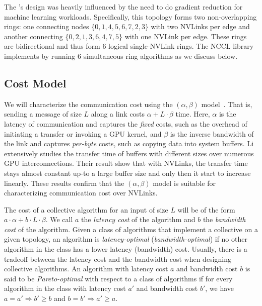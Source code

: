The \dgxone's design was heavily influenced by the need to do gradient reduction for machine learning workloads. Specifically, this topology forms two non-overlapping rings: one connecting nodes $\{0,1,4,5,6,7,2,3\}$ with two NVLinks per edge and another connecting $\{0,2,1,3,6,4,7,5\}$ with one NVLink per edge. These rings are bidirectional and thus form $6$ logical single-NVLink rings. The NCCL library implements \allgather by running $6$ simultaneous ring algorithms as we discuss below.


\subsection{Cost Model}

We will characterize the communication cost using the $(\alpha, \beta)$ model~\cite{hockney1994communication}. That is, sending a message of size $L$ along a link costs $\alpha + L\cdot\beta$ time.
Here, $\alpha$ is the latency of communication and captures the {\em fixed} costs, such as the overhead of initiating a transfer or invoking a GPU kernel,
and $\beta$ is the inverse bandwidth of the link and captures {\em per-byte} costs, such as copying data into system buffers. Li \etal{} extensively studies the transfer time of buffers with
different sizes over numerous GPU interconnections\cite{alphabeta}. Their result show that with NVLinks, the transfer time stays almost constant up-to a large buffer size and only then it start to increase linearly.
These results confirm that the $(\alpha,\beta)$ model is suitable for characterizing communication cost over NVLinks.

The cost of a collective algorithm for an input of size $L$ will be of the form $a\cdot\alpha + b \cdot L \cdot \beta$. We call $a$ the {\em latency cost} of the algorithm and $b$ the {\em bandwidth cost} of the algorithm. Given a class of algorithms that implement a collective on a given topology, an algorithm is {\em latency-optimal} ({\em bandwidth-optimal}) if no other algorithm in the class has a lower latency (bandwidth) cost. Usually, there is a tradeoff between the latency cost and the bandwidth cost when designing collective algorithms.  An algorithm with latency cost $a$ and bandwidth cost $b$ is said to be {\em Pareto-optimal} with respect to a class of algorithms if for every algorithm in the class with latency cost $a'$ and bandwidth cost $b'$, we have $a = a' \Rightarrow b' \geq b$ and $b = b' \Rightarrow  a' \geq a$.

